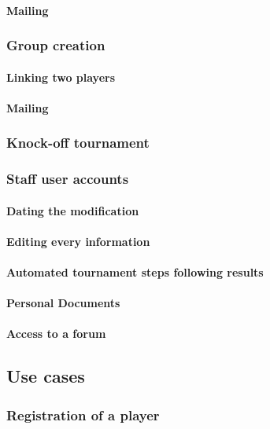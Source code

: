 \paragraph{Mailing}

\subsubsection{Group creation}

\paragraph{Linking two players}
\paragraph{Mailing}

\subsubsection{Knock-off tournament}
\subsubsection{Staff user accounts}

\paragraph{Dating the modification}
\paragraph{Editing every information}
\paragraph{Automated tournament steps following results}
\paragraph{Personal Documents}
\paragraph{Access to a forum}

\subsection{Use cases}
\subsubsection{Registration of a player}

